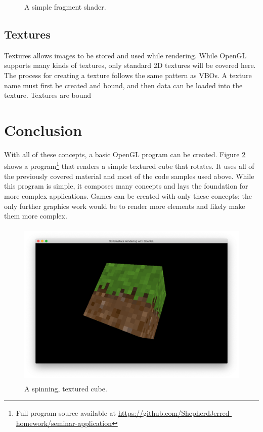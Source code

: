\documentclass{article}
\begin{document}
\begin{figure}[h]
	
	\caption{A simple fragment shader.}
	\label{fig:fragment-shader}
\end{figure}

\subsection{Textures}
Textures allows images to be stored and used while rendering. While OpenGL supports many kinds of textures, only standard 2D textures will be covered here. The process for creating a texture follows the same pattern as VBOs. A texture name must first be created and bound, and then data can be loaded into the texture. Textures are bound

\section{Conclusion}
With all of these concepts, a basic OpenGL program can be created. Figure \ref{fig:final-product} shows a program\footnote{Full program source available at \url{https://github.com/ShepherdJerred-homework/seminar-application}} that renders a simple textured cube that rotates. It uses all of the previously covered material and most of the code samples used above. While this program is simple, it composes many concepts and lays the foundation for more complex applications. Games can be created with only these concepts; the only further graphics work would be to render more elements and likely make them more complex.

\begin{figure}[h]
    \centering
    \includegraphics[height=8cm]{textured-cube.png}
	\caption{A spinning, textured cube.}
	\label{fig:final-product}
\end{figure}
\end{document}
